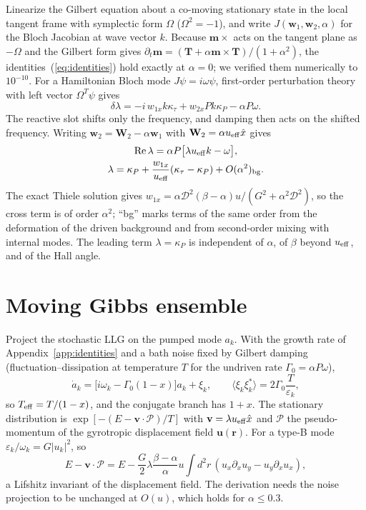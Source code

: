 \documentclass[prb,reprint,amsmath,amssymb,superscriptaddress,floatfix]{revtex4-2}
\newcommand{\ueff}{u_{\rm eff}}
\newcommand{\vm}{\mathbf m}
\newcommand{\vv}{\mathbf v}
\newcommand{\wone}{\mathbf w_1}
\newcommand{\wtwo}{\mathbf w_2}
\newcommand{\Wtwo}{\mathbf W_2}
\newcommand{\kP}{\kappa_P}
\newcommand{\kt}{\kappa_\tau}
\newcommand{\Dm}{\mathcal D}
\newcommand{\Pg}{\mathcal P}
\begin{document}
Linearize the Gilbert equation about a co-moving stationary state in the local tangent frame with symplectic form $\Omega$ ($\Omega^2=-1$), and write $J(\wone,\wtwo,\alpha)$ for the Bloch Jacobian at wave vector $k$. Because $\vm\times$ acts on the tangent plane as $-\Omega$ and the Gilbert form gives $\partial_t\vm=(\mathbf T+\alpha\vm\times\mathbf T)/(1+\alpha^2)$, the identities~(\ref{eq:identities}) hold exactly at $\alpha=0$; we verified them numerically to $10^{-10}$. For a Hamiltonian Bloch mode $J\psi=i\omega\psi$, first-order perturbation theory with left vector $\Omega^T\psi$ gives
\begin{equation}
\delta\lambda=-i\,w_{1x}k\kt+w_{2x}Pk\kP-\alpha P\omega .
\end{equation}
The reactive slot shifts only the frequency, and damping then acts on the shifted frequency. Writing $\wtwo=\Wtwo-\alpha\wone$ with $\Wtwo=\alpha\ueff\hat x$ gives
\begin{gather}
\mathrm{Re}\,\lambda=\alpha P\big[\lambda\ueff k-\omega\big],\nonumber\\
\lambda=\kP+\frac{w_{1x}}{\ueff}(\kt-\kP)+O(\alpha^2)_{\rm bg}.
\end{gather}
The exact Thiele solution gives $w_{1x}=\alpha\Dm^2(\beta-\alpha)u/(G^2+\alpha^2\Dm^2)$, so the cross term is of order $\alpha^2$; ``bg'' marks terms of the same order from the deformation of the driven background and from second-order mixing with internal modes. The leading term $\lambda=\kP$ is independent of $\alpha$, of $\beta$ beyond $\ueff$, and of the Hall angle.

\section{Moving Gibbs ensemble}
\label{app:gibbs}

Project the stochastic LLG on the pumped mode $a_k$. With the growth rate of Appendix~\ref{app:identities} and a bath noise fixed by Gilbert damping (fluctuation--dissipation at temperature $T$ for the undriven rate $\Gamma_0=\alpha P\omega$),
\begin{equation}
\dot a_k=\big[i\omega_k-\Gamma_0(1-x)\big]a_k+\xi_k,\qquad \langle\xi_k\xi_k^*\rangle=2\Gamma_0\frac{T}{\varepsilon_k},
\end{equation}
so $T_{\rm eff}=T/(1-x)$, and the conjugate branch has $1+x$. The stationary distribution is $\exp[-(E-\vv\cdot\Pg)/T]$ with $\vv=\lambda\ueff\hat x$ and $\Pg$ the pseudo-momentum of the gyrotropic displacement field $\mathbf u(\mathbf r)$. For a type-B mode $\varepsilon_k/\omega_k=G|u_k|^2$, so
\begin{equation}
E-\vv\cdot\Pg=E-\frac{G}{2}\lambda\frac{\beta-\alpha}{\alpha}u\int d^2r\,(u_x\partial_xu_y-u_y\partial_xu_x),
\end{equation}
a Lifshitz invariant of the displacement field. The derivation needs the noise projection to be unchanged at $O(u)$, which holds for $\alpha\le0.3$.
\end{document}

